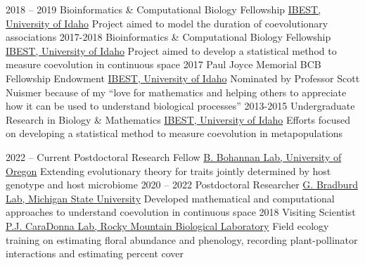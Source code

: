 \documentclass[9pt]{developercv} %
\begin{document}
\vspace{-10 pt}
\begin{entrylist}
    \entry
        {2018 -- 2019}
        {Bioinformatics \& Computational Biology Fellowship}
        {\href{https://www.iids.uidaho.edu/about.php}{IBEST, University of Idaho}}
        {Project aimed to model the duration of coevolutionary associations}
    \entry
        {2017-2018}
        {Bioinformatics \& Computational Biology Fellowship}
        {\href{https://www.iids.uidaho.edu/about.php}{IBEST, University of Idaho}}
        {Project aimed to develop a statistical method to measure coevolution in continuous space}
    \entry
        {2017}
        {Paul Joyce Memorial BCB Fellowship Endowment}
        {\href{https://www.iids.uidaho.edu/about.php}{IBEST, University of Idaho}}
        {Nominated by Professor Scott Nuismer because of my “love for mathematics and helping others to appreciate how it can be used to understand biological processes”}
    \entry
        {2013-2015}
        {Undergraduate Research in Biology \& Mathematics}
        {\href{https://www.iids.uidaho.edu/about.php}{IBEST, University of Idaho}}
        {Efforts focused on developing a statistical method to measure coevolution in metapopulations}
\end{entrylist}

\vspace{-5 pt}
\begin{entrylist}
	\entry
        {2022 -- Current}
		{Postdoctoral Research Fellow}
		{\href{https://pages.uoregon.edu/bohannanlab/}{B. Bohannan Lab, University of Oregon}}
		{Extending evolutionary theory for traits jointly determined by host genotype and host microbiome}
        \entry
        {2020 -- 2022}
		{Postdoctoral Researcher}
		{\href{http://www.genescape.org/people.html}{G. Bradburd Lab, Michigan State University}}
		{Developed mathematical and computational approaches to understand coevolution in continuous space}
        \entry
        {2018}
		{Visiting Scientist}
		{\href{http://paulcaradonna.weebly.com/}{P.J. CaraDonna Lab, Rocky Mountain Biological Laboratory}}
		{Field ecology training on estimating floral abundance and phenology, recording plant-pollinator interactions and estimating percent cover}
\end{entrylist}
\end{document}
